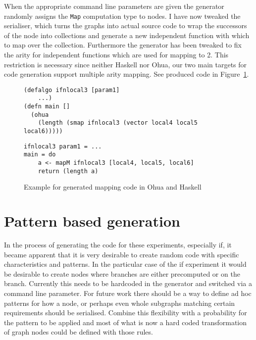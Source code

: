 When the appropriate command line parameters are given the generator randomly assigns the \texttt{Map} computation type to nodes.
I have now tweaked the serialiser, which turns the graphs into actual source code to wrap the successors of the node into collections and generate a new independent function with which to map over the collection.
Furthermore the generator has been tweaked to fix the arity for independent functions which are used for mapping to 2.
This restriction is necessary since neither Haskell nor Ohua, our two main targets for code generation support multiple arity mapping.
See produced code in Figure~\ref{fig:generated-map-code}.

\begin{figure}
\begin{verbatim}
(defalgo ifnlocal3 [param1]
    ...)
(defn main []
  (ohua
    (length (smap ifnlocal3 (vector local4 local5 local6)))))
\end{verbatim}
\begin{verbatim}
ifnlocal3 param1 = ...
main = do
    a <- mapM ifnlocal3 [local4, local5, local6]
    return (length a)
\end{verbatim}
\caption{Example for generated mapping code in Ohua and Haskell}
\label{fig:generated-map-code}
\end{figure}

\section{Pattern based generation}

In the process of generating the code for these experiments, especially if, it became apparent that it is very desirable to create random code with specific characteristics and patterns.
In the particular case of the if experiment it would be desirable to create nodes where branches are either precomputed or on the branch.
Currently this needs to be hardcoded in the generator and switched via a command line parameter.
For future work there should be a way to define ad hoc patterns for how a node, or perhaps even whole subgraphs matching certain requirements should be serialised.
Combine this flexibility with a probability for the pattern to be applied and most of what is now a hard coded transformation of graph nodes could be defined with those rules.
